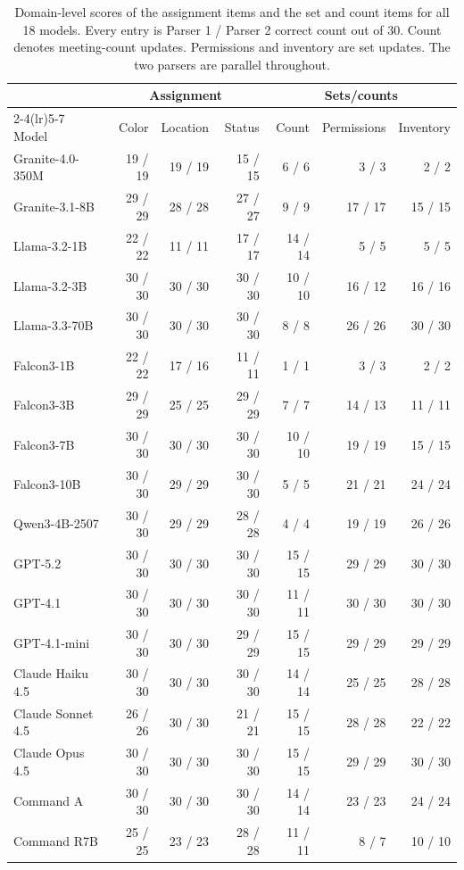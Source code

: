 \begin{table}[t]
\centering
\footnotesize
\setlength{\tabcolsep}{3pt}
\begin{tabular}{lrrrrrr}
\toprule
 & \multicolumn{3}{c}{Assignment} & \multicolumn{3}{c}{Sets/counts} \\
\cmidrule(lr){2-4}\cmidrule(lr){5-7}
Model & Color & Location & Status & Count & Permissions & Inventory \\
\midrule
Granite-4.0-350M & 19 / 19 & 19 / 19 & 15 / 15 & 6 / 6 & 3 / 3 & 2 / 2 \\
Granite-3.1-8B & 29 / 29 & 28 / 28 & 27 / 27 & 9 / 9 & 17 / 17 & 15 / 15 \\
Llama-3.2-1B & 22 / 22 & 11 / 11 & 17 / 17 & 14 / 14 & 5 / 5 & 5 / 5 \\
Llama-3.2-3B & 30 / 30 & 30 / 30 & 30 / 30 & 10 / 10 & 16 / 12 & 16 / 16 \\
Llama-3.3-70B & 30 / 30 & 30 / 30 & 30 / 30 & 8 / 8 & 26 / 26 & 30 / 30 \\
Falcon3-1B & 22 / 22 & 17 / 16 & 11 / 11 & 1 / 1 & 3 / 3 & 2 / 2 \\
Falcon3-3B & 29 / 29 & 25 / 25 & 29 / 29 & 7 / 7 & 14 / 13 & 11 / 11 \\
Falcon3-7B & 30 / 30 & 30 / 30 & 30 / 30 & 10 / 10 & 19 / 19 & 15 / 15 \\
Falcon3-10B & 30 / 30 & 29 / 29 & 30 / 30 & 5 / 5 & 21 / 21 & 24 / 24 \\
Qwen3-4B-2507 & 30 / 30 & 29 / 29 & 28 / 28 & 4 / 4 & 19 / 19 & 26 / 26 \\
GPT-5.2 & 30 / 30 & 30 / 30 & 30 / 30 & 15 / 15 & 29 / 29 & 30 / 30 \\
GPT-4.1 & 30 / 30 & 30 / 30 & 30 / 30 & 11 / 11 & 30 / 30 & 30 / 30 \\
GPT-4.1-mini & 30 / 30 & 30 / 30 & 29 / 29 & 15 / 15 & 29 / 29 & 29 / 29 \\
Claude Haiku 4.5 & 30 / 30 & 30 / 30 & 30 / 30 & 14 / 14 & 25 / 25 & 28 / 28 \\
Claude Sonnet 4.5 & 26 / 26 & 30 / 30 & 21 / 21 & 15 / 15 & 28 / 28 & 22 / 22 \\
Claude Opus 4.5 & 30 / 30 & 30 / 30 & 30 / 30 & 15 / 15 & 29 / 29 & 30 / 30 \\
Command A & 30 / 30 & 30 / 30 & 30 / 30 & 14 / 14 & 23 / 23 & 24 / 24 \\
Command R7B & 25 / 25 & 23 / 23 & 28 / 28 & 11 / 11 & 8 / 7 & 10 / 10 \\
\bottomrule
\end{tabular}
\caption{Domain-level scores of the assignment items and the set and count items for all 18 models. Every entry is Parser 1 / Parser 2 correct count out of 30. Count denotes meeting-count updates. Permissions and inventory are set updates. The two parsers are parallel throughout.}
\label{tab:ef-domains}
\end{table}
